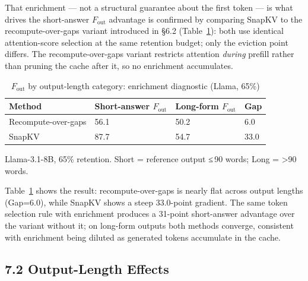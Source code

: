 \documentclass[10pt,letterpaper]{article}
\begin{document}
That enrichment --- not a structural guarantee about the first token --- is
what drives the short-answer \(F_{\text{out}}\) advantage is confirmed by
comparing SnapKV to the recompute-over-gaps variant introduced in §6.2
(Table~\ref{tab:rog}): both use identical attention-score selection at
the same retention budget; only the eviction point differs. The
recompute-over-gaps variant restricts attention \emph{during} prefill
rather than pruning the cache after it, so no enrichment accumulates.

\begin{table}[H]
\centering
\small
\caption{\(F_{\text{out}}\) by output-length category: enrichment diagnostic (Llama, 65\%)}
\label{tab:rog}
\begin{tabular}{@{}llll@{}}
\toprule
Method & Short-answer \(F_{\text{out}}\) & Long-form \(F_{\text{out}}\) & Gap\\
\midrule
Recompute-over-gaps & 56.1 & 50.2 & 6.0\\
SnapKV              & 87.7 & 54.7 & 33.0\\
\bottomrule
\end{tabular}

\center Llama-3.1-8B, 65\% retention. Short = reference output ≤\,90 words; Long = \textgreater{}90 words.
\end{table}

Table~\ref{tab:rog} shows the result: recompute-over-gaps is nearly flat
across output lengths (Gap=6.0), while SnapKV shows a steep 33.0-point
gradient. The same token selection rule with enrichment produces a
31-point short-answer advantage over the variant without it; on long-form
outputs both methods converge, consistent with enrichment being diluted
as generated tokens accumulate in the cache.

\hypertarget{output-length-effects}{%
\subsection{7.2 Output-Length Effects}\label{output-length-effects}}
\end{document}

